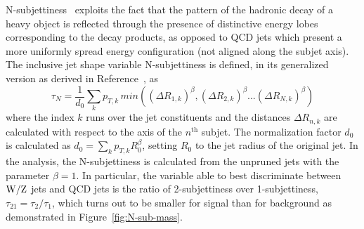 N-subjettiness~\cite{Thaler:2010tr,Thaler:2011gf,Stewart:2010tn} exploits the fact that the pattern of the hadronic decay of a heavy object is reflected through the presence of distinctive energy lobes corresponding to the decay products, as opposed to QCD jets which present a more uniformly spread energy configuration (not aligned along the subjet axis). The inclusive jet shape variable N-subjettiness is defined, in its generalized version as derived in Reference~\cite{Thaler:2010tr}, as 
%
\begin{equation}
\tau_N = \frac{1}{d_{0}} \sum_{k} p_{T,k}\,min( (\Delta R_{1,k})^{\beta}, (\Delta R_{2,k})^{\beta}...(\Delta R_{N,k})^{\beta})
\label{eq:nsub}
\end{equation}
%
where the index $k$ runs over the jet constituents and the distances
$\Delta R_{n,k}$ are calculated with respect to the axis of the $n^{\mathrm{th}}$
subjet. The normalization factor $d_{0}$ is calculated as $d_{0}=
\sum_{k} p_{T,k}R^{\beta}_{0}$, setting $R_{0}$ to the jet radius of
the original jet. In the analysis, the N-subjettiness is calculated
from the unpruned jets with the parameter $\beta=1$. In particular,
the variable able to best discriminate between ${\rm W}/{\rm Z}$ jets and QCD jets
is the ratio of 2-subjettiness over 1-subjettiness,
$\tau_{21}=\tau_{2} / \tau_{1}$, which turns out to be smaller for signal than for background as demonstrated in Figure~\ref{fig:N-sub-mass}.

